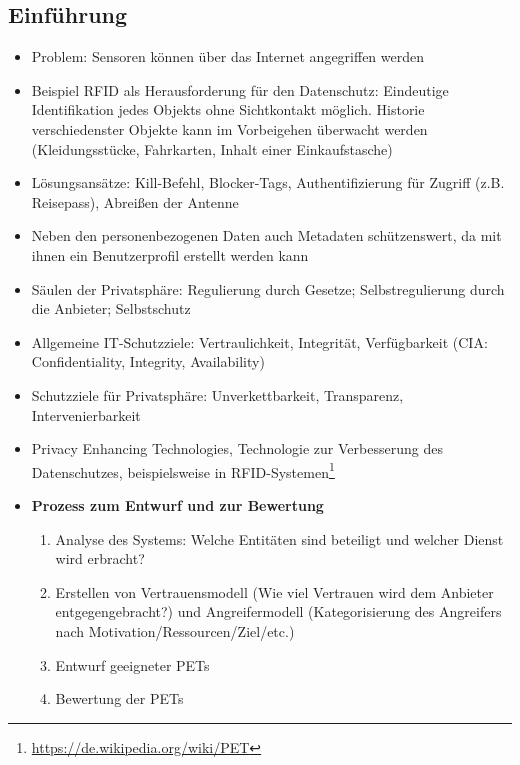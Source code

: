 \subsection{Einführung}
\begin{itemize}
	\item Problem: Sensoren können über das Internet angegriffen werden
	\item Beispiel RFID als Herausforderung für den Datenschutz: Eindeutige Identifikation jedes Objekts ohne Sichtkontakt möglich. Historie verschiedenster Objekte kann im Vorbeigehen überwacht werden (Kleidungsstücke, Fahrkarten, Inhalt einer Einkaufstasche)
	\item Lösungsansätze: Kill-Befehl, Blocker-Tags, Authentifizierung für Zugriff (z.B. Reisepass), Abreißen der Antenne
	\item Neben den personenbezogenen Daten auch Metadaten schützenswert, da mit ihnen ein Benutzerprofil erstellt werden kann
	\item Säulen der Privatsphäre: Regulierung durch Gesetze; Selbstregulierung durch die Anbieter; Selbstschutz
	\item Allgemeine IT-Schutzziele: Vertraulichkeit, Integrität, Verfügbarkeit (CIA: Confidentiality, Integrity, Availability)
	\item Schutzziele für Privatsphäre: Unverkettbarkeit, Transparenz, Intervenierbarkeit
	\item Privacy Enhancing Technologies, Technologie zur Verbesserung des Datenschutzes, beispielsweise in RFID-Systemen\footnote{\url{https://de.wikipedia.org/wiki/PET}}
	\item \textbf{Prozess zum Entwurf und zur Bewertung}
	\begin{enumerate}
		\item Analyse des Systems: Welche Entitäten sind beteiligt und welcher Dienst wird erbracht?
		\item Erstellen von Vertrauensmodell (Wie viel Vertrauen wird dem Anbieter entgegengebracht?) und Angreifermodell (Kategorisierung des Angreifers nach Motivation/Ressourcen/Ziel/etc.)
		\item Entwurf geeigneter PETs
		\item Bewertung der PETs
	\end{enumerate}
\end{itemize}


